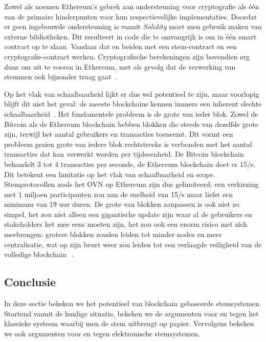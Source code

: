 	 Zowel \textcite{McCorry2017} als \textcite{Dagher2018} noemen Ethereum's gebrek aan ondersteuning voor cryptografie als één van de primaire hinderpunten voor hun respectievelijke implementaties. Doordat er geen ingebouwde ondersteuning is vanuit \textit{Solidity} moet men gebruik maken van externe bibliotheken. Dit resulteert in code die te omvangrijk is om in één smart contract op te slaan. Vandaar dat   \textcite{McCorry2017} en \textcite{Dagher2018} beiden met een stem-contract en een cryptografie-contract werken. Cryptografische berekeningen zijn bovendien erg duur om uit te voeren in Ethereum, met als gevolg dat de verwerking van stemmen ook bijzonder traag gaat~\autocite{Dagher2018}.
	 
	 Op het vlak van schaalbaarheid lijkt er dus wel potentieel te zijn, maar voorlopig blijft dit niet het geval: de meeste blockchains kennen immers een inherent slechte schaalbaarheid~\autocite{Blenkinsop2018}. Het fundamentele probleem is de grote van ieder blok. Zowel de Bitcoin als de Ethereum blockchain hebben blokken die steeds van dezelfde grote zijn, terwijl het aantal gebruikers en transacties toeneemt. Dit vormt een probleem gezien grote van iedere blok rechtstreeks is verbonden met het aantal transacties dat kan verwerkt worden per tijdseenheid. De Bitcoin blockchain behandelt 3 tot 4 transacties per seconde, de Ethereum blockchain doet er 15/s. Dit betekent een limitatie op het vlak van schaalbaarheid en scope. Stemprotocollen zoals het OVN op Ethereum zijn dus gelimiteerd: een verkiezing met 1 miljoen participanten zou aan de snelheid van 15/s maar liefst een minimum van 19 uur duren. De grote van blokken aanpassen is ook niet zo simpel, het zou niet alleen een gigantische update zijn waar al de gebruikers en stakeholders het mee eens moeten zijn, het zou ook een enorm risico met zich meebrengen:  grotere blokken zouden leiden tot minder nodes en meer centralisatie, wat op zijn beurt weer zou leiden tot een verlaagde veiligheid van de volledige blockchain ~\autocite{Blenkinsop2018}.

	\subsection{Conclusie} 
	In deze sectie bekeken we het potentieel van blockchain gebaseerde stemsystemen. Startend vanuit de huidige situatie, bekeken we de argumenten voor en tegen het klassieke systeem waarbij men de stem uitbrengt op papier. Vervolgens bekeken we ook argumenten voor en tegen elektronische stemsystemen.  
	
